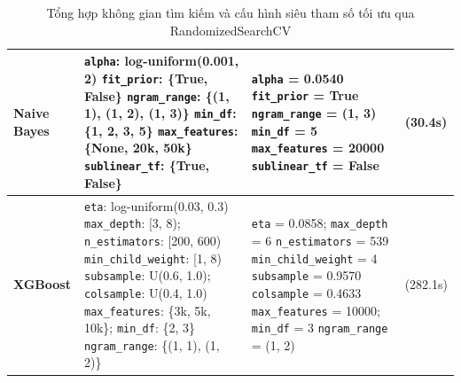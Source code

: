 \begin{table}[H]
\begin{tabularx}{\textwidth}{|>{\raggedright\arraybackslash}p{2.3cm}|>{\raggedright\arraybackslash}X|>{\raggedright\arraybackslash}p{4.3cm}|>{\centering\arraybackslash}p{2.2cm}|}
\textbf{Naive Bayes} &
\texttt{alpha}: log-uniform(0.001, 2) \newline
\texttt{fit\_prior}: \{True, False\} \newline
\texttt{ngram\_range}: \{(1, 1), (1, 2), (1, 3)\} \newline
\texttt{min\_df}: \{1, 2, 3, 5\} \newline
\texttt{max\_features}: \{None, 20k, 50k\} \newline
\texttt{sublinear\_tf}: \{True, False\} &
\texttt{alpha} = 0.0540 \newline
\texttt{fit\_prior} = True \newline
\texttt{ngram\_range} = (1, 3) \newline
\texttt{min\_df} = 5 \newline
\texttt{max\_features} = 20000 \newline
\texttt{sublinear\_tf} = False &
0.8285 \newline (30.4s) \\ \hline

\textbf{XGBoost} &
\texttt{eta}: log-uniform(0.03, 0.3) \newline
\texttt{max\_depth}: [3, 8); \texttt{n\_estimators}: [200, 600) \newline
\texttt{min\_child\_weight}: [1, 8) \newline
\texttt{subsample}: U(0.6, 1.0); \texttt{colsample}: U(0.4, 1.0) \newline
\texttt{max\_features}: \{3k, 5k, 10k\}; \texttt{min\_df}: \{2, 3\} \newline
\texttt{ngram\_range}: \{(1, 1), (1, 2)\} &
\texttt{eta} = 0.0858; \texttt{max\_depth} = 6 \newline
\texttt{n\_estimators} = 539 \newline
\texttt{min\_child\_weight} = 4 \newline
\texttt{subsample} = 0.9570 \newline
\texttt{colsample} = 0.4633 \newline
\texttt{max\_features} = 10000; \texttt{min\_df} = 3 \newline
\texttt{ngram\_range} = (1, 2) &
0.8290 \newline (282.1s) \\ \hline
\end{tabularx}
\caption{Tổng hợp không gian tìm kiếm và cấu hình siêu tham số tối ưu qua RandomizedSearchCV}
\label{tab:tuning_summary}
\end{table}

